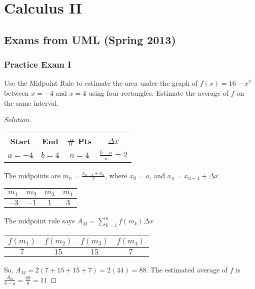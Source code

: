 \documentclass[crop=false,class=article,oneside]{standalone}
\begin{document}
    \ifx\ifmathcoursescalculusII\undefined
        \section*{Calculus II}
        \setcounter{section}{1}
    \fi
    \subsection{Exams from UML (Spring 2013)}
        \subsubsection{Practice Exam I}
        \begin{problem}
        Use the Midpoint Rule to estimate the area under the graph of $f(x)=16-x^{2}$ between $x=-4$ and $x=4$ using four rectangles. Estimate the average of $f$ on the same interval.
        \end{problem}
        \begin{proof}[Solution]
        \
        \begin{table}[H]
            \centering
            \begin{tabular}{|c|c|c|c|}
                \hline
                Start&End&\# Pts&$\Delta x$\\
                \hline
                $a=-4$&$b=4$&$n=4$&$\frac{b-a}{n}=2$\\
                \hline
            \end{tabular}
        \end{table}
        The midpoints are $m_{n}=\frac{x_{n-1}+x_{n}}{2}$, where $x_{0}=a$, and $x_{n}=x_{n-1}+\Delta x$.
        \begin{table}[H]
            \centering
            \begin{tabular}{|c|c|c|c|}
                \hline
                $m_{1}$&$m_{2}$&$m_{3}$&$m_{4}$\\
                \hline
                $-3$&$-1$&$1$&$3$\\
                \hline
            \end{tabular}
        \end{table}
        The midpoint rule says $A_{M}=\sum_{k=1}^{n}f(m_{k})\Delta x$
        \begin{table}[H]
            \centering
            \begin{tabular}{|c|c|c|c|}
                \hline
                $f(m_{1})$&$f(m_{2})$&$f(m_{3})$&$f(m_{4})$\\
                \hline
                $7$&$15$&$15$&$7$\\
                \hline
            \end{tabular}
        \end{table}
        So, $A_{M}=2(7+15+15+7)=2(44)=88$. The estimated average of $f$ is $\frac{A_{m}}{b-a}=\frac{88}{8}=11$
        \end{proof}
\end{document}
